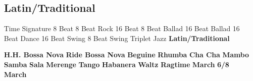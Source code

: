 \subsection{Latin/Traditional}
Time Signature
8 Beat
8 Beat Rock
16 Beat
8 Beat Ballad
16 Beat Ballad
16 Beat Dance
16 Beat Swing
8 Beat Swing
Triplet
Jazz
\textbf{Latin/Traditional}





























\textbf{H.H. Bossa Nova}
\textbf{Ride Bossa Nova}
\textbf{Beguine}
\textbf{Rhumba}
\textbf{Cha Cha}
\textbf{Mambo}
\textbf{Samba}
\textbf{Sala}
\textbf{Merenge}
\textbf{Tango}
\textbf{Habanera}
\textbf{Waltz}
\textbf{Ragtime}
\textbf{March}
\textbf{6/8 March}
